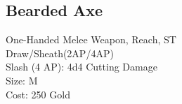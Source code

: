 \subsection{Bearded Axe}\label{weapon:beardedAxe}
One-Handed Melee Weapon,  Reach, ST\\
Draw/Sheath(2AP/4AP)\\
Slash (4 AP): 4d4 Cutting Damage\\
Size: M\\
Cost: 250 Gold\\